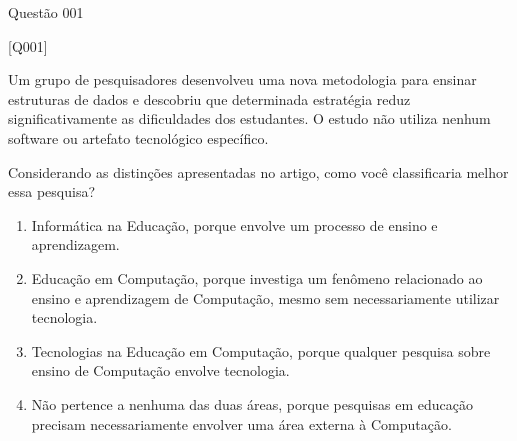 \documentclass[xcolor=dvipsnames,table]{beamer}
\begin{document}
    \begin{frame}{Questão 001}

		\footnotesize

        \begin{block}{[Q001]}

            Um grupo de pesquisadores desenvolveu uma nova metodologia para ensinar estruturas de dados e descobriu que determinada estratégia reduz significativamente as dificuldades dos estudantes. O estudo não utiliza nenhum software ou artefato tecnológico específico.

            Considerando as distinções apresentadas no artigo, como você classificaria melhor essa pesquisa?

        \end{block}

        \begin{enumerate}[label=(\Alph*)]

            \item Informática na Educação, porque envolve um processo de ensino e aprendizagem.

            \item Educação em Computação, porque investiga um fenômeno relacionado ao ensino e aprendizagem de Computação, mesmo sem necessariamente utilizar tecnologia.

            \item Tecnologias na Educação em Computação, porque qualquer pesquisa sobre ensino de Computação envolve tecnologia.

            \item Não pertence a nenhuma das duas áreas, porque pesquisas em educação precisam necessariamente envolver uma área externa à Computação.

         \end{enumerate}

    \end{frame}
\end{document}
